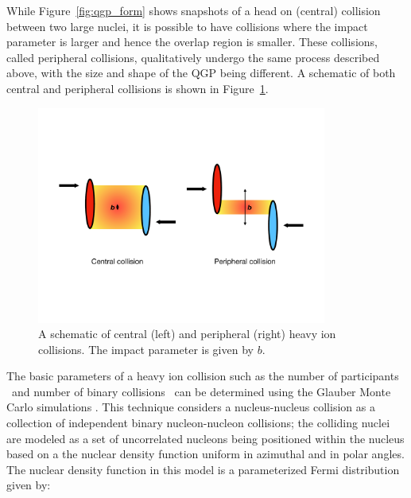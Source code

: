 While Figure~\ref{fig:qgp_form} shows snapshots of a head on (central) collision between two large nuclei, it is possible to have collisions where the impact parameter is larger and hence the overlap region is smaller.
These collisions, called peripheral collisions, qualitatively undergo the same process described above, with the size and shape of the QGP being different.
A schematic of both central and peripheral collisions is shown in Figure~\ref{fig:collision_centrality}.

\begin{figure}[htbp]
\begin{center}
\includegraphics[width=0.85\textwidth]{figures/theory/collision_centrality}
\caption{A schematic of central (left) and peripheral (right) heavy ion collisions.
The impact parameter is given by $b$.}
\label{fig:collision_centrality}
\end{center}
\end{figure}


The basic parameters of a heavy ion collision such as the number of participants \Npart\ and number of binary collisions \Ncoll\ can be determined using the Glauber Monte Carlo simulations \cite{glauberArticle, glauberMisc}.
This technique considers a nucleus-nucleus collision as a collection of independent binary nucleon-nucleon collisions; the colliding nuclei are modeled as a set of uncorrelated nucleons being positioned within the nucleus based on a the nuclear density function uniform in azimuthal and in polar angles.
The nuclear density function in this model is a parameterized Fermi distribution given by: 

